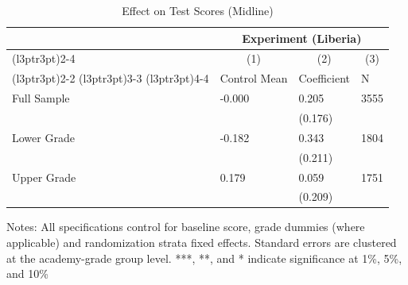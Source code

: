 \begin{table}[!h]
\centering
\caption{Effect on Test Scores (Midline)}
\centering
\begin{threeparttable}
\begin{tabular}[t]{llll}
\toprule
\multicolumn{1}{c}{ } & \multicolumn{3}{c}{Experiment (Liberia)} \\
\cmidrule(l{3pt}r{3pt}){2-4}
\multicolumn{1}{c}{ } & \multicolumn{1}{c}{(1)} & \multicolumn{1}{c}{(2)} & \multicolumn{1}{c}{(3)} \\
\cmidrule(l{3pt}r{3pt}){2-2} \cmidrule(l{3pt}r{3pt}){3-3} \cmidrule(l{3pt}r{3pt}){4-4}
 & Control Mean & Coefficient & N\\
\midrule
Full Sample & -0.000 & 0.205 & 3555\\
 &  & (0.176) & \\
Lower Grade & -0.182 & 0.343 & 1804\\
 &  & (0.211) & \\
Upper Grade & 0.179 & 0.059 & 1751\\
 &  & (0.209) & \\
\bottomrule
\end{tabular}
\begin{tablenotes}[para]
\item Notes: All specifications control for baseline score, grade dummies (where applicable) and randomization strata fixed effects. Standard errors are clustered at the academy-grade group level. ***, **, and * indicate significance at 1\%, 5\%, and 10\%
\end{tablenotes}
\end{threeparttable}
\end{table}
